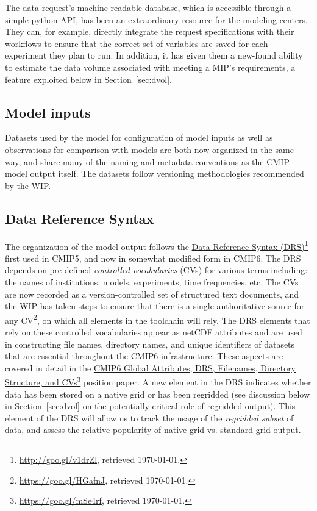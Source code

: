 \documentclass[gmd,manuscript]{copernicus}
\newcommand{\urlref}[2] {\href{#1}{#2}\footnote{\url{#1}, retrieved \today.}}
\begin{document}
The data request's machine-readable database, which is accessible
through a simple python API, has been an extraordinary resource for
the modeling centers. They can, for example, directly integrate the
request specifications with their workflows to ensure that the correct
set of variables are saved for each experiment they plan to run. In
addition, it has given them a new-found ability to estimate the data
volume associated with meeting a MIP's requirements, a feature
exploited below in Section~\ref{sec:dvol}.

\subsection{Model inputs}
\label{sec:data-inputs}

Datasets used by the model for configuration of model inputs
\citep[\texttt{input4MIPs}, see][]{ref:duracketal2017} as well as
observations for comparison with models \citep[\texttt{obs4MIPs},
see][]{ref:teixeiraetal2014} are both now organized in the same way, 
and share many of the naming and metadata conventions as the
CMIP model output itself. The datasets follow versioning
methodologies recommended by the WIP.

\subsection{Data Reference Syntax}
\label{sec:data-drs}

The organization of the model output follows the
\urlref{http://goo.gl/v1drZl}{Data Reference Syntax (DRS)} first used in
CMIP5, and now in somewhat modified form in CMIP6. The DRS depends on
pre-defined \emph{controlled vocabularies} (CVs) for various terms
including: the names of institutions, models, experiments, time
frequencies, etc. The CVs are now recorded as a version-controlled set
of structured text documents, and the WIP has taken steps to ensure
that there is a \urlref{https://goo.gl/HGafnJ}{single authoritative
  source for any CV}, on which all elements in the toolchain will
rely. The DRS elements that rely on these controlled vocabularies
appear as netCDF attributes and are used in constructing file names,
directory names, and unique identifiers of datasets that are essential
throughout the CMIP6 infrastructure. These aspects are covered in
detail in the \urlref{https://goo.gl/mSe4rf}{CMIP6 Global Attributes,
  DRS, Filenames, Directory Structure, and CVs} position paper. A new
element in the DRS indicates whether data has been stored on a native
grid or has been regridded (see discussion below in Section~\ref{sec:dvol} on
the potentially critical role of regridded output). This element of
the DRS will allow us to track the usage of the \emph{regridded
  subset} of data, and assess the relative popularity of native-grid
vs. standard-grid output.
\end{document}
